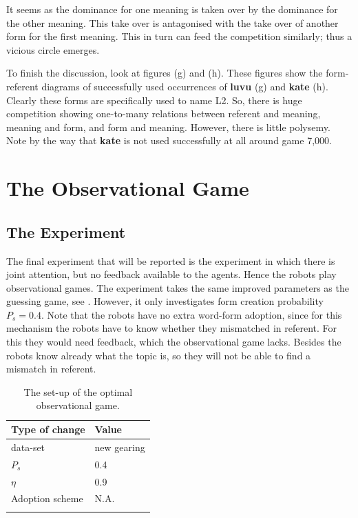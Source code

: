 It seems as the dominance for one meaning is taken over by the dominance for the other meaning. This take over is antagonised with the take over of another form for the first meaning. This in turn can feed the competition similarly; thus a vicious circle emerges.


To finish the discussion, look at figures (g) and (h). These figures show the form-referent diagrams of successfully used occurrences of {\bf luvu} (g) and {\bf kate} (h). Clearly these forms are specifically used to name L2. So, there is huge competition showing one-to-many relations between referent and meaning, meaning and form, and form and meaning. However, there is little polysemy. Note by the way that {\bf kate} is not used successfully at all around game 7,000.


\section{The Observational Game}\label{s:opt:oli}

\subsection{The Experiment}

The final experiment that will be reported is the experiment in which there is joint attention, but no feedback available to the agents. Hence the robots play observational games. The experiment takes the same improved parameters as the guessing game, see . However, it only investigates form creation probability $P_s=0.4$. Note that the robots have no extra word-form adoption, since for this mechanism the robots have to know whether they mismatched in referent. For this they would need feedback, which the observational game lacks. Besides the robots know already what the topic is, so they will not be able to find a mismatch in referent.

\begin{table}[t]
\centering
\begin{tabular}{ll}
\lsptoprule
Type of change & Value\\\midrule
data-set & new gearing\\%
$P_s$ & 0.4\\%
$\eta$ & 0.9\\%
Adoption scheme & N.A.\\%
\lspbottomrule
\end{tabular}
\caption{The set-up of the optimal observational game. }
\label{t:opt:oli}
\end{table}


